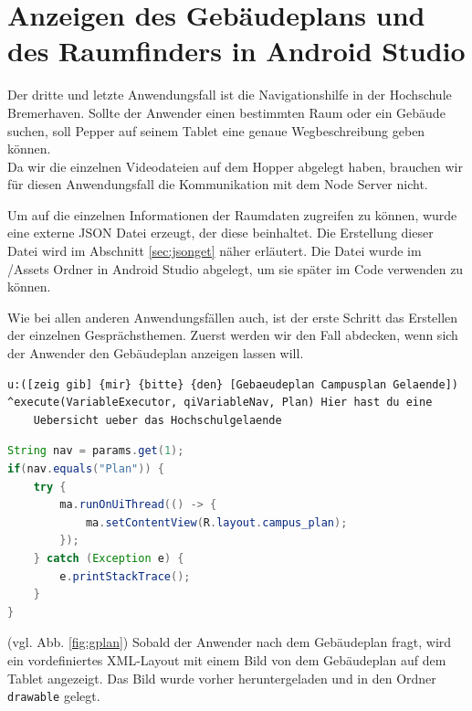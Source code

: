 \section{Anzeigen des Gebäudeplans und des Raumfinders in Android Studio}

Der dritte und letzte Anwendungsfall ist die Navigationshilfe in der Hochschule Bremerhaven. Sollte der Anwender einen bestimmten Raum oder ein Gebäude suchen, soll Pepper auf seinem Tablet eine genaue Wegbeschreibung geben können. 
\\
Da wir die einzelnen Videodateien auf dem Hopper abgelegt haben, brauchen wir für diesen Anwendungsfall die Kommunikation mit dem Node Server nicht. 

Um auf die einzelnen Informationen der Raumdaten zugreifen zu können, wurde eine externe JSON Datei erzeugt, der diese beinhaltet. Die Erstellung dieser Datei wird im Abschnitt \ref{sec:jsonget} näher erläutert. Die Datei wurde im /Assets Ordner in Android Studio abgelegt, um sie später im Code verwenden zu können. 

Wie bei allen anderen Anwendungsfällen auch, ist der erste Schritt das Erstellen der einzelnen Gesprächsthemen. 
Zuerst werden wir den Fall abdecken, wenn sich der Anwender den Gebäudeplan anzeigen lassen will.\\

\begin{lstlisting}[caption={Topic - Raumfinder}]
u:([zeig gib] {mir} {bitte} {den} [Gebaeudeplan Campusplan Gelaende])
^execute(VariableExecutor, qiVariableNav, Plan) Hier hast du eine 
    Uebersicht ueber das Hochschulgelaende
\end{lstlisting}


\begin{lstlisting}[language=Java, caption={Anzeigen des Gebäudeplans}]
String nav = params.get(1);
if(nav.equals("Plan")) {
    try {
        ma.runOnUiThread(() -> {
            ma.setContentView(R.layout.campus_plan);
        });
    } catch (Exception e) {
        e.printStackTrace();
    }
}
\end{lstlisting}

(vgl. Abb. \ref{fig:gplan}) Sobald der Anwender nach dem Gebäudeplan fragt, wird ein vordefiniertes XML-Layout mit einem Bild von dem 
Gebäudeplan auf dem Tablet angezeigt. Das Bild wurde vorher heruntergeladen und in den Ordner 
\verb|drawable| gelegt.\\

